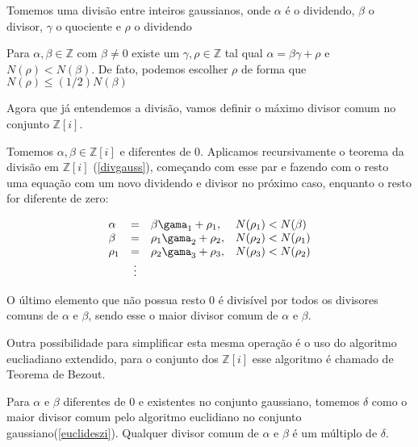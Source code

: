 Tomemos uma divis\~ao entre inteiros gaussianos, onde $\alpha$ \'e o dividendo, $\beta$ o divisor, $\gamma$ o quociente e $\rho$ o dividendo

\begin{Th}  \label{divgauss}

Para $ \alpha, \beta \in \mathbb{Z} $ com $\beta \neq 0$ existe um $\gamma, \rho \in \mathbb{Z}$ tal qual $\alpha = \beta \gamma + \rho$ e $N(\rho) < N(\beta)$. De fato, podemos escolher $\rho$  de forma que $N(\rho) \leq (1/2)N(\beta)$

\end{Th}

Agora que j\'a entendemos a divis\~ao, vamos definir o m\'aximo divisor comum no conjunto $\mathbb{Z}[i]$.

\begin{Th}
\label{euclideszi}

Tomemos $\alpha , \beta \in \mathbb{Z}[i]$ e diferentes de $0$. Aplicamos recursivamente o teorema da divis\~ao em $\mathbb{Z}[i]$ (\ref{divgauss}), come\c{c}ando com esse par e fazendo com o resto uma  equa\c{c}\~ao com um novo dividendo e divisor no pr\'oximo caso, enquanto o resto for diferente de zero:

\[
\begin{array}{lcll}
\alpha & = & \beta \gama_1 + \rho_1,  & N(\rho_1) < N(\beta)  \\
\beta  & = & \rho_1 \gama_2 + \rho_2, & N(\rho_2) < N(\rho_1) \\
\rho_1 & = & \rho_2 \gama_3 + \rho_3, & N(\rho_3) < N(\rho_2) \\
& \vdots &  &\\
\end{array}
\]

O \'ultimo elemento que n\~ao possua resto $0$ \'e divis\'ivel por todos os divisores comuns de $\alpha$ e $\beta$, sendo esse o maior divisor comum de $\alpha$ e $\beta$.

\end{Th}

Outra possibilidade para simplificar esta mesma opera\c{c}\~ao \'e o uso do algoritmo eucliadiano extendido, para o conjunto dos $\mathbb{Z}[i]$ esse algoritmo \'e chamado de Teorema de Bezout.

\begin{Cor} \label{cor}
	Para $\alpha$ e $\beta$ diferentes de $0$ e existentes no conjunto gaussiano, tomemos $\delta$ como o maior divisor comum pelo algoritmo euclidiano no conjunto gaussiano(\ref{euclideszi}). Qualquer divisor comum de $\alpha$ e $\beta$ \'e um m\'ultiplo de $\delta$.
\end{Cor}

